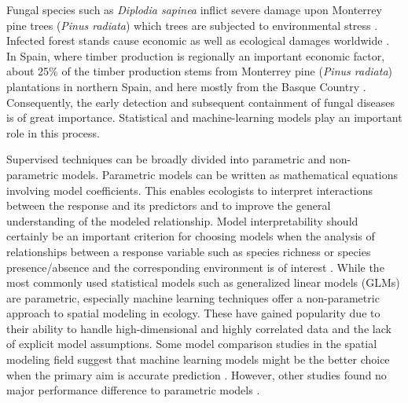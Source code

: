 \documentclass[review]{elsarticle}
\begin{document}
Fungal species such as \textit{Diplodia sapinea} inflict severe damage upon Monterrey pine trees (\textit{Pinus radiata}) which trees are subjected to environmental stress \citep{Wingfield2008}.
Infected forest stands cause economic as well as ecological damages worldwide \citep{Ganley2009}.
In Spain, where timber production is regionally an important economic factor, about 25\% of the timber production stems from Monterrey pine (\textit{Pinus radiata}) plantations in northern Spain, and here mostly from the Basque Country \citep{Iturritxa2014}.
Consequently, the early detection and subsequent containment of fungal diseases is of great importance.
Statistical and machine-learning models play an important role in this process.

Supervised techniques can be broadly divided into parametric and non-parametric models.
Parametric models can be written as mathematical equations involving model coefficients.
This enables ecologists to interpret interactions between the response and its predictors and to improve the general understanding of the modeled relationship.
Model interpretability should certainly be an important criterion for choosing models when the analysis of relationships between a response variable such as species richness or species presence/absence and the corresponding environment is of interest \citep{Goetz2015}.
While the most commonly used statistical models such as generalized linear models (GLMs) are parametric, especially machine learning techniques offer a non-parametric approach to spatial modeling in ecology.
These have gained popularity due to their ability to handle high-dimensional and highly correlated data and the lack of explicit model assumptions.
Some model comparison studies in the spatial modeling field suggest that machine learning models might be the better choice when the primary aim is accurate prediction \citep{Hong2015, Smolinski2016, Youssef2015}.
However, other studies found no major performance difference to parametric models \citep{Bui2015, Goetz2015}.
\end{document}
